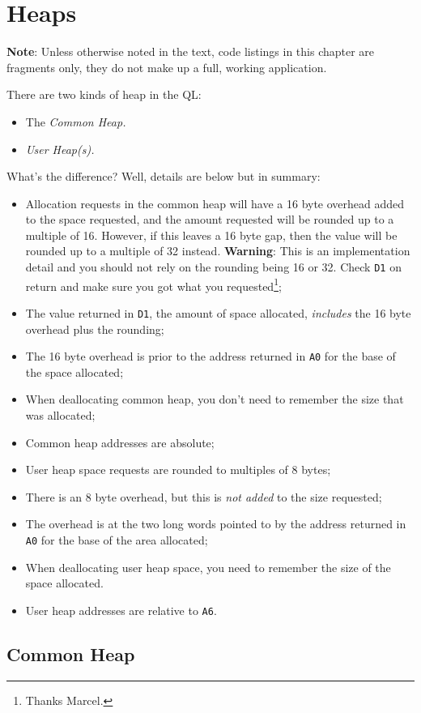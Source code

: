 
\chapter{Heaps}

\textbf{Note}: Unless otherwise noted in the text, code listings in
this chapter are fragments only, they do not make up a full, working
application.

There are two kinds of heap in the QL:
\begin{itemize}
\item The \emph{Common Heap.}
\item \emph{User Heap(s).}
\end{itemize}
What's the difference? Well, details are below but in summary:
\begin{itemize}
\item Allocation requests in the common heap will have a 16 byte overhead
added to the space requested, and the amount requested will be rounded
up to a multiple of 16. However, if this leaves a 16 byte gap, then
the value will be rounded up to a multiple of 32 instead. \textbf{Warning}:
This is an implementation detail and you should not rely on the rounding
being 16 or 32. Check \texttt{D1} on return and make sure you got
what you requested\footnote{Thanks Marcel.};
\item The value returned in \texttt{D1}, the amount of space allocated,
\emph{includes} the 16 byte overhead plus the rounding;
\item The 16 byte overhead is prior to the address returned in \texttt{A0}
for the base of the space allocated;
\item When deallocating common heap, you don't need to remember the size
that was allocated;
\item Common heap addresses are absolute;
\item User heap space requests are rounded to multiples of 8 bytes;
\item There is an 8 byte overhead, but this is \emph{not added} to the size
requested;
\item The overhead is at the two long words pointed to by the address returned
in \texttt{A0} for the base of the area allocated;
\item When deallocating user heap space, you need to remember the size of
the space allocated.
\item User heap addresses are relative to \texttt{A6}.
\end{itemize}

\section{Common Heap}

